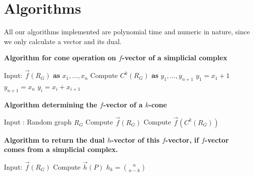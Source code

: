 \documentclass[oneside,12pt]{amsart}
\theoremstyle{definition}
\numberwithin{equation}{section}
\begin{document}
\section{Algorithms} \label{algorithms} All our algorithms implemented are polynomial time and numeric in nature, since we only calculate a vector and its dual.


%
\begin{center}
\textbf{Algorithm for cone operation on $f$-vector of a simplicial complex}
\end{center}

\vspace{.1in}

\begin{algorithmic}
\State Input:  $\overrightarrow{f}(R_G)$ \textbf{as} $x_1,\dots,x_n$
\State Compute  $C^{k}(R_G)$ \textbf{as} $y_1,\dots,y_{n+1}$
 \State $y_1 = x_1 + 1$
 \State $y_{n+1} = x_n$
\Else
 \State $y_i = x_i + x_{i+1}$
\EndIf
\EndFor
\end{algorithmic}

\vspace{.5in}



\begin{center}
\textbf{Algorithm determining the $f$-vector of a $k$-cone}
\end{center}

\vspace{.1in}
\begin{algorithmic}
\State Input : Random graph $R_G$
\State Compute $\overrightarrow{f}(R_G)$
\State Compute $\overrightarrow{f}(C^k(R_G))$
\EndFor
\end{algorithmic}

\vspace{.5in}

\begin{center}
\textbf{Algorithm to return the dual $h$-vector of this $f$-vector, if $f$-vector comes from a simplicial complex.}
\end{center}

\vspace{.1in}

\begin{algorithmic}
\State Input: $\overrightarrow{f}(R_G)$
\State Compute $\overrightarrow{h}(P)$
\State    $h_k = {n \choose n-k}$
\Else
{}%
\EndIf
\EndFor
\EndFor

\end{algorithmic}
\end{document}
